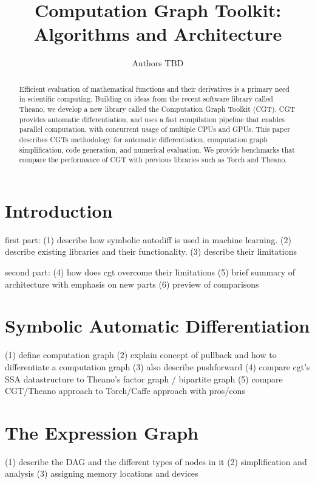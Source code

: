 \documentclass{article} %
\title{Computation Graph Toolkit: Algorithms and Architecture}
\author{
Authors TBD
}
\begin{document}
\maketitle

\begin{abstract}

Efficient evaluation of mathematical functions and their derivatives is a primary need in scientific computing.
Building on ideas from the recent software library called Theano, we develop a new library called the Computation Graph Toolkit (CGT).
CGT provides automatic differentiation, and uses a fast compilation pipeline that enables parallel computation, 
with concurrent usage of multiple CPUs and GPUs.
This paper describes CGTs methodology for automatic differentiation, computation graph simplification, code generation, and numerical evaluation.
We provide benchmarks that compare the performance of CGT with previous libraries such as Torch and Theano.

\end{abstract}

\section{Introduction}

first part:
(1) describe how symbolic autodiff is used in machine learning. 
(2) describe existing libraries and their functionality.
(3) describe their limitations

second part:
(4) how does cgt overcome their limitations
(5) brief summary of architecture with emphasis on new parts
(6) preview of comparisons

\section{Symbolic Automatic Differentiation}

(1) define computation graph
(2) explain concept of pullback and how to differentiate a computation graph
(3) also describe pushforward
(4) compare cgt's SSA datastructure to Theano's factor graph / bipartite graph
(5) compare CGT/Theano approach to Torch/Caffe approach with pros/cons

\section{The Expression Graph}


(1) describe the DAG and the different types of nodes in it
(2) simplification and analysis
(3) assigning memory locations and devices
\end{document}
